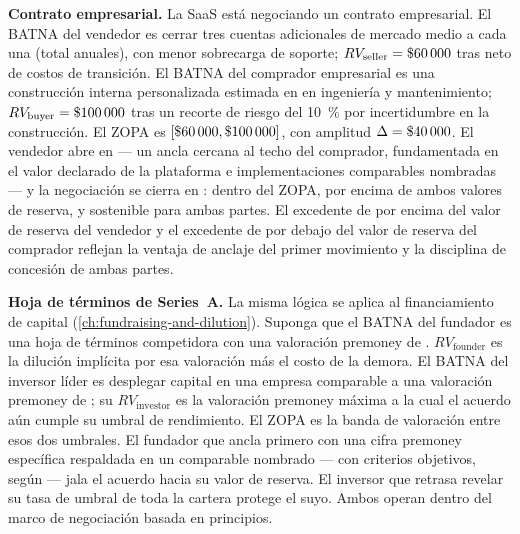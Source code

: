 \begin{example}
\textbf{Contrato empresarial.} La SaaS está negociando un contrato empresarial. El BATNA del
vendedor es cerrar tres cuentas adicionales de mercado medio a  cada una (total
 anuales), con menor sobrecarga de soporte; \(RV_{\text{seller}} = \$\num{60000}\)
tras neto de costos de transición. El BATNA del comprador empresarial es una construcción
interna personalizada estimada en  en ingeniería y mantenimiento;
\(RV_{\text{buyer}} = \$\num{100000}\) tras un recorte de riesgo del \qty{10}{\percent} por
incertidumbre en la construcción. El ZOPA es \([\$\num{60000}, \$\num{100000}]\), con amplitud
\(\Delta = \$\num{40000}\). El vendedor abre en  --- un ancla cercana al techo del
comprador, fundamentada en el valor declarado de la plataforma e implementaciones comparables
nombradas --- y la negociación se cierra en : dentro del ZOPA, por encima de ambos
valores de reserva, y sostenible para ambas partes. El excedente de  por encima del
valor de reserva del vendedor y el excedente de  por debajo del valor de reserva del
comprador reflejan la ventaja de anclaje del primer movimiento y la disciplina de concesión de
ambas partes.

\textbf{Hoja de términos de Series~A.} La misma lógica se aplica al financiamiento de capital
(\cref{ch:fundraising-and-dilution}). Suponga que el BATNA del fundador es una hoja de términos
competidora con una valoración premoney de .
\(RV_{\text{founder}}\) es la dilución implícita por esa valoración más el costo de la demora.
El BATNA del inversor líder es desplegar capital en una empresa comparable a una valoración
premoney de ; su \(RV_{\text{investor}}\) es la valoración premoney máxima a la
cual el acuerdo aún cumple su umbral de rendimiento. El ZOPA es la banda de valoración entre
esos dos umbrales. El fundador que ancla primero con una cifra premoney específica respaldada en
un comparable nombrado --- con criterios objetivos, según \textcite{raiffa1982art} --- jala el
acuerdo hacia su valor de reserva. El inversor que retrasa revelar su tasa de umbral de toda la
cartera protege el suyo. Ambos operan dentro del marco de negociación basada en principios.
\end{example}

